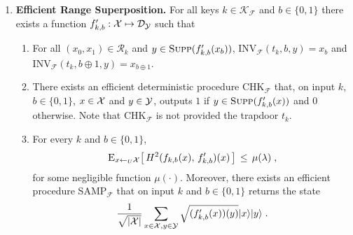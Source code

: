 \begin{definition}
\begin{enumerate}
\item{\textbf{Efficient Range Superposition.}}
For all keys $k\in \mathcal{K}_{\mathcal{F}}$ and $b\in \{0,1\}$ there exists a function $f'_{k,b}:\mathcal{X}\mapsto \mathcal{D}_{\mathcal{Y}}$ such that
\begin{enumerate} 
\item For all $(x_0,x_1)\in \mathcal{R}_k$ and $y\in \textsc{Supp}(f'_{k,b}(x_b))$, INV$_{\mathcal{F}}(t_k,b,y) = x_b$ and INV$_{\mathcal{F}}(t_k,b\oplus 1,y) = x_{b\oplus 1}$. 
\item There exists an efficient deterministic procedure CHK$_{\mathcal{F}}$ that, on input $k$, $b\in \{0,1\}$, $x\in \mathcal{X}$ and $y\in \mathcal{Y}$, outputs $1$ if  $y\in \textsc{Supp}(f'_{k,b}(x))$ and $0$ otherwise. Note that CHK$_{\mathcal{F}}$ is not provided the trapdoor $t_k$. 
\item For every $k$ and $b\in\{0,1\}$, 
$$ \textsc{E}_{x\leftarrow_U \mathcal{X}} \big[\,H^2(f_{k,b}(x),\,f'_{k,b})(x)\,\big] \,\leq\, \mu(\lambda)\;,$$
 for some negligible function $\mu(\cdot)$. Moreover, there exists an efficient procedure  SAMP$_{\mathcal{F}}$ that on input $k$ and $b\in\{0,1\}$ returns the state
\begin{equation}
    \frac{1}{\sqrt{|\mathcal{X}|}}\sum_{x\in \mathcal{X},y\in \mathcal{Y}}\sqrt{(f'_{k,b}(x))(y)}|x\rangle|y\rangle\;.
\end{equation}


\end{enumerate}



\end{enumerate}
\end{definition}
